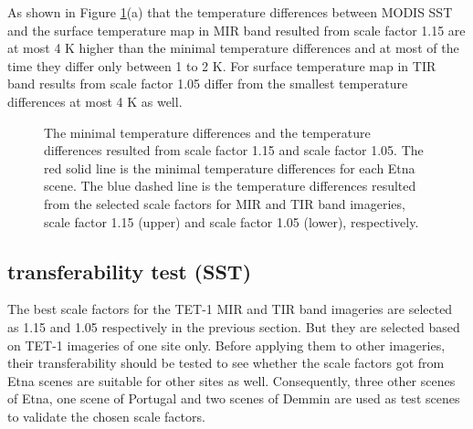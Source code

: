 \noindent As shown in Figure \ref{fig:etna_bsc&temComp}(a) that the temperature differences between MODIS SST and the surface temperature map in MIR band resulted from scale factor 1.15 are at most 4 K higher than the minimal temperature differences and at most of the time they differ only between 1 to 2 K. For surface temperature map in TIR band results from scale factor 1.05 differ from the smallest temperature differences at most 4 K as well.\\

\begin{figure}[!htbp]
\centering
{}
\hspace{0.5in}
\caption{The minimal temperature differences and the temperature differences resulted from scale factor 1.15 and scale factor 1.05. The red solid line is the minimal temperature differences for each Etna scene. The blue dashed line is the temperature differences resulted from the selected scale factors for MIR and TIR band imageries, scale factor 1.15 (upper) and scale factor 1.05 (lower), respectively.}
\label{fig:etna_bsc&temComp}
\end{figure}



\subsection{transferability test (SST)}
The best scale factors for the TET-1 MIR and TIR band imageries are selected as 1.15 and 1.05 respectively in the previous section. But they are selected based on TET-1 imageries of one site only. Before applying them to other imageries, their transferability should be tested to see whether the scale factors got from Etna scenes are suitable for other sites as well. Consequently, three other scenes of Etna, one scene of Portugal and two scenes of Demmin are used as test scenes to validate the chosen scale factors.\\

